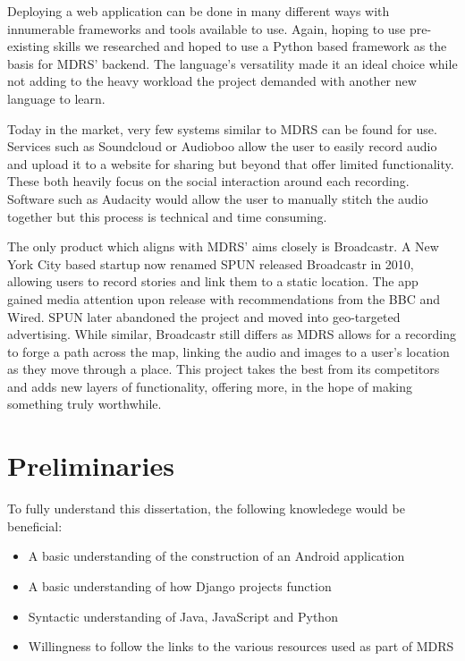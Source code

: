 \documentclass{l3proj}
\begin{document}
Deploying a web application can be done in many different ways with innumerable frameworks and tools available to use. Again, hoping to use pre-existing skills we researched and hoped to use a \gls{Python} based framework as the basis for MDRS’ backend.  The language's versatility made it an ideal choice while not adding to the heavy workload the project demanded with another new language to learn.

Today in the market, very few systems similar to MDRS can be found for use. Services such as Soundcloud or Audioboo allow the user to easily record audio and upload it to a website for sharing but beyond that offer limited functionality. These both heavily focus on the social interaction around each recording. Software such as Audacity would allow the user to manually stitch the audio together but this process is technical and time consuming.

The only product which aligns with MDRS' aims closely is Broadcastr. A New York City based startup now renamed SPUN released Broadcastr in 2010, allowing users to record stories and link them to a static location. The app gained media attention upon release with recommendations from the BBC and Wired. SPUN later abandoned the project and moved into geo-targeted advertising. While similar, Broadcastr still differs as MDRS allows for a recording to forge a path across the map, linking the audio and images to a user’s location as they move through a place. This project takes the best from its competitors and adds new layers of functionality, offering more, in the hope of making something truly worthwhile.

\section{Preliminaries}
To fully understand this dissertation, the following knowledege would be beneficial:
\begin{itemize}
\item A basic understanding of the construction of an Android application
\item A basic understanding of how \gls{Django} projects function
\item Syntactic understanding of Java, JavaScript and Python
\item Willingness to follow the links to the various resources used as part of MDRS
\end{itemize}

\end{document}
